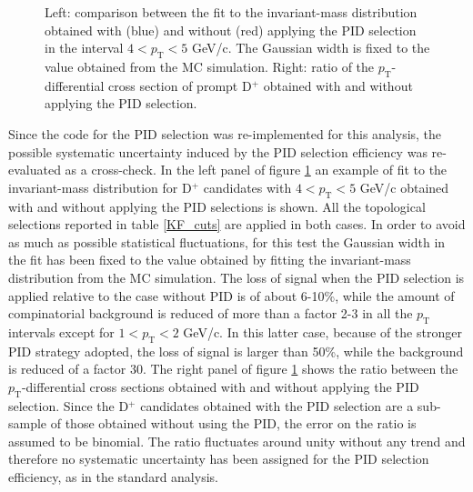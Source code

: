 \documentclass[b5paper,10pt,twoside,oldstyle,classica]{toptesi}
\newcommand{\pt}{p_\text{T}}
\begin{document}
\begin{figure}[tb]
\begin{center}
\caption{Left: comparison between the fit to the invariant-mass distribution obtained with (blue) and without (red) applying the PID selection in the interval $4<\pt<5$ GeV/c. The Gaussian width is fixed to the value obtained from the MC simulation. Right: ratio of the $\pt$-differential cross section of prompt D$^+$ obtained with and without applying the PID selection.}
\label{KF_PID_syst}
\end{center}
\end{figure} 
Since the code for the PID selection was re-implemented for this analysis, the possible systematic uncertainty induced by the PID selection efficiency was re-evaluated as a cross-check. In the left panel of figure \ref{KF_PID_syst} an example of fit to 
the invariant-mass distribution for D$^+$ candidates with $4<\pt<5$ GeV/c obtained with and without applying the PID selections is shown. All the topological selections reported in table \ref{KF_cuts} are applied in both cases. In order to avoid as much as possible statistical fluctuations, for this test the Gaussian width in the fit has been fixed to the value obtained by fitting the invariant-mass distribution from the MC simulation. The loss of signal when the PID selection is applied relative to the case without PID is of about 6-10\%, while the amount of compinatorial background is reduced of more than a factor 2-3 in all the $\pt$ intervals except for $1<\pt<2$ GeV/c. In this latter case, because of the stronger PID strategy adopted, the loss of signal is larger than 50\%, while the background is reduced of a factor 30. The right panel of figure \ref{KF_PID_syst} shows the ratio between the $\pt$-differential cross sections obtained with and without applying the PID selection. Since the D$^+$ candidates obtained with the PID selection are a sub-sample of those obtained without using the PID, the error on the ratio is assumed to be binomial. The ratio fluctuates around unity without any trend and therefore no systematic uncertainty has been assigned for the PID selection efficiency, as in the standard analysis.
\end{document}
